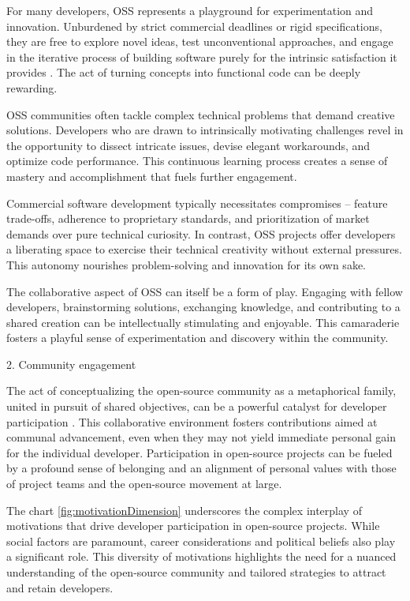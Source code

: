 For many developers, OSS represents a playground for experimentation and innovation. Unburdened by strict commercial deadlines or rigid specifications, they are free to explore novel ideas, test unconventional approaches, and engage in the iterative process of building software purely for the intrinsic satisfaction it provides .  The act of turning concepts into functional code can be deeply rewarding.

OSS communities often tackle complex technical problems that demand creative solutions.  Developers who are drawn to intrinsically motivating challenges revel in the opportunity to dissect intricate issues, devise elegant workarounds, and optimize code performance. This continuous learning process creates a sense of mastery and accomplishment that fuels further engagement.

Commercial software development typically necessitates compromises – feature trade-offs, adherence to proprietary standards, and prioritization of market demands over pure technical curiosity. In contrast, OSS projects offer developers a liberating space to exercise their technical creativity without external pressures. This autonomy nourishes problem-solving and innovation for its own sake.

The collaborative aspect of OSS can itself be a form of play.  Engaging with fellow developers, brainstorming solutions, exchanging knowledge, and contributing to a shared creation can be intellectually stimulating and enjoyable. This camaraderie fosters a playful sense of experimentation and discovery within the community.


2. Community engagement

The act of conceptualizing the open-source community as a metaphorical family, united in pursuit of shared objectives, can be a powerful catalyst for developer participation \parencite{05bitzer2007intrinsic,07zhao2024openrank, 08zhang2024paid, 09lakhani2005hackers, 13li2012leadership, 16ke2008motivations, 17alexander2002working}. This collaborative environment fosters contributions aimed at communal advancement, even when they may not yield immediate personal gain for the individual developer. Participation in open-source projects can be fueled by a profound sense of belonging and an alignment of personal values with those of project teams and the open-source movement at large.

The chart \ref{fig:motivationDimension} underscores the complex interplay of motivations that drive developer participation in open-source projects. While social factors are paramount, career considerations and political beliefs also play a significant role. This diversity of motivations highlights the need for a nuanced understanding of the open-source community and tailored strategies to attract and retain developers.

